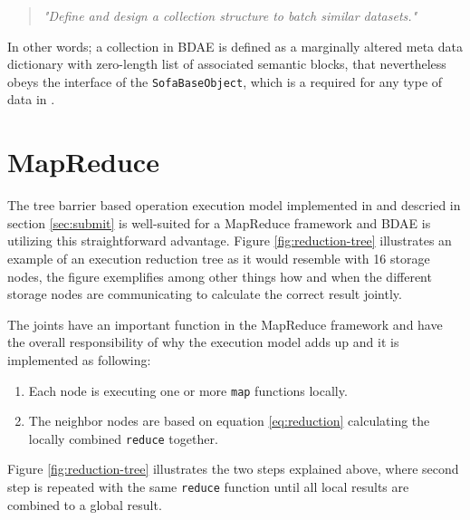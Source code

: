\begin{quotation}
	\textit{"Define and design a collection structure to batch similar datasets."}
\end{quotation}

In other words; a collection in BDAE is defined as a marginally altered meta data dictionary with zero-length list of associated semantic blocks, that nevertheless obeys the interface of the \texttt{SofaBaseObject}, which is a required for any type of data in \CodeName.

\section{MapReduce}
The tree barrier based operation execution model implemented in \CodeName and descried in section \ref{sec:submit} is well-suited for a MapReduce framework and BDAE is utilizing this straightforward advantage. Figure \ref{fig:reduction-tree} illustrates an example of an execution reduction tree as it would resemble with 16 storage nodes, the figure exemplifies among other things how and when the different storage nodes are communicating to calculate the correct result jointly.
\newline

The joints have an important function in the MapReduce framework and have the overall responsibility of why the execution model adds up and it is implemented as following:
\begin{enumerate}
	\item Each node is executing one or more \texttt{map} functions locally.
	\item The neighbor nodes are based on equation \ref{eq:reduction} calculating the locally combined \texttt{reduce} together.
\end{enumerate}

Figure \ref{fig:reduction-tree} illustrates the two steps explained above, where second step is repeated with the same \texttt{reduce} function until all local results are combined to a global result.

